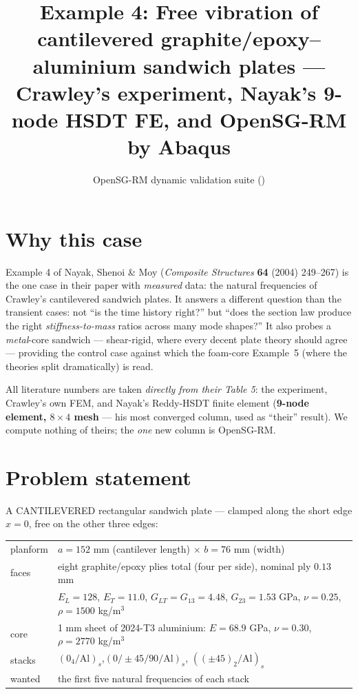 \documentclass[11pt]{article}
\title{Example 4: Free vibration of cantilevered graphite/epoxy--aluminium
sandwich plates --- Crawley's experiment, Nayak's 9-node HSDT FE, and
OpenSG-RM by Abaqus}
\author{OpenSG-RM dynamic validation suite (\code{examples/opensg-rm\_dynamic/ex4})}
\date{}
\begin{document}
\maketitle

\section{Why this case}
Example 4 of Nayak, Shenoi \& Moy (\emph{Composite Structures} \textbf{64}
(2004) 249--267) is the one case in their paper with \emph{measured}
data: the natural frequencies of Crawley's cantilevered sandwich plates.
It answers a different question than the transient cases: not ``is the
time history right?'' but ``does the section law produce the right
\emph{stiffness-to-mass} ratios across many mode shapes?''  It also probes
a \emph{metal}-core sandwich --- shear-rigid, where every decent plate
theory should agree --- providing the control case against which the
foam-core Example~5 (where the theories split dramatically) is read.

All literature numbers are taken \emph{directly from their Table 5}: the
experiment, Crawley's own FEM, and Nayak's Reddy-HSDT finite element
(\textbf{9-node element, $8\times4$ mesh} --- his most converged column,
used as ``their'' result).  We compute nothing of theirs; the \emph{one}
new column is OpenSG-RM.

\section{Problem statement}
A CANTILEVERED rectangular sandwich plate --- clamped along the short edge
$x=0$, free on the other three edges:

\begin{center}\begin{tabular}{ll}\toprule
planform & $a=152$ mm (cantilever length) $\times$ $b=76$ mm (width)\\
faces & eight graphite/epoxy plies total (four per side), nominal ply
$0.13$ mm\\
 & $E_L=128$, $E_T=11.0$, $G_{LT}=G_{13}=4.48$, $G_{23}=1.53$ GPa,
$\nu=0.25$, $\rho=1500$ kg/m$^3$\\
core & 1 mm sheet of 2024-T3 aluminium: $E=68.9$ GPa, $\nu=0.30$,
$\rho=2770$ kg/m$^3$\\
stacks & $(0_4/\mathrm{Al})_s$,\quad $(0/{\pm}45/90/\mathrm{Al})_s$,\quad
$((\pm45)_2/\mathrm{Al})_s$\\
wanted & the first five natural frequencies of each stack\\
\bottomrule\end{tabular}\end{center}
\end{document}
